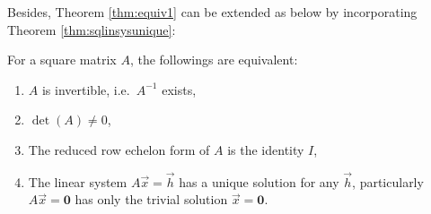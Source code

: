Besides, Theorem \ref{thm:equiv1} can be extended as below by incorporating Theorem \ref{thm:sqlinsysunique}:
\begin{thm}
\label{thm:equiv2}
For a square matrix $A$, the followings are equivalent:
\begin{enumerate}[label=(\alph*)]
\item $A$ is invertible, i.e.\ $A^{-1}$ exists,
\item $\det(A) \neq 0$,
\item The reduced row echelon form of $A$ is the identity $I$,
\item The linear system $A\vec{x} = \vec{h}$ has a unique solution for any $\vec{h}$, particularly $A\vec{x} = \textbf{0}$ has only the trivial solution $\vec{x} = \textbf{0}$.
\end{enumerate}
\end{thm}

